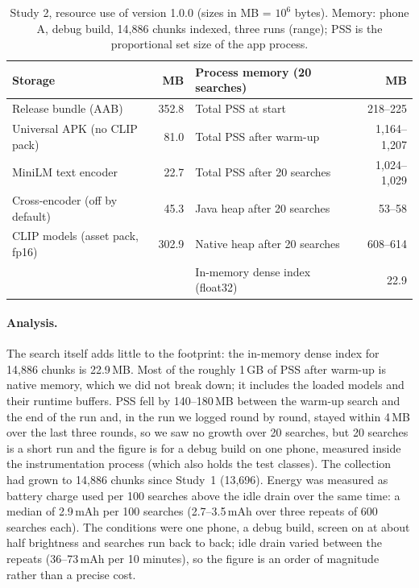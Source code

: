 \documentclass[pdflatex,sn-basic,Numbered]{sn-jnl}
\begin{document}
\begin{table}[tbp]
\centering\footnotesize\setlength{\tabcolsep}{3pt}
\caption{Study 2, resource use of version 1.0.0 (sizes in MB = $10^6$ bytes). Memory: phone A, debug build, 14,886 chunks indexed, three runs (range); PSS is the proportional set size of the app process.}
\label{tab:resources}
\begin{tabular}{lr@{\hspace{2.5em}}lr}
\toprule
Storage & MB & Process memory (20 searches) & MB \\
\midrule
Release bundle (AAB) & 352.8 & Total PSS at start & 218--225 \\
Universal APK (no CLIP pack) & 81.0 & Total PSS after warm-up & 1,164--1,207 \\
MiniLM text encoder & 22.7 & Total PSS after 20 searches & 1,024--1,029 \\
Cross-encoder (off by default) & 45.3 & Java heap after 20 searches & 53--58 \\
CLIP models (asset pack, fp16) & 302.9 & Native heap after 20 searches & 608--614 \\
 & & In-memory dense index (float32) & 22.9 \\
\bottomrule
\end{tabular}
\end{table}

\paragraph{Analysis.} The search itself adds little to the footprint: the in-memory dense index for 14,886 chunks is 22.9\,MB. Most of the roughly 1\,GB of PSS after warm-up is native memory, which we did not break down; it includes the loaded models and their runtime buffers. PSS fell by 140--180\,MB between the warm-up search and the end of the run and, in the run we logged round by round, stayed within 4\,MB over the last three rounds, so we saw no growth over 20 searches, but 20 searches is a short run and the figure is for a debug build on one phone, measured inside the instrumentation process (which also holds the test classes). The collection had grown to 14,886 chunks since Study~1 (13,696). Energy was measured as battery charge used per 100 searches above the idle drain over the same time: a median of 2.9\,mAh per 100 searches (2.7--3.5\,mAh over three repeats of 600 searches each). The conditions were one phone, a debug build, screen on at about half brightness and searches run back to back; idle drain varied between the repeats (36--73\,mAh per 10 minutes), so the figure is an order of magnitude rather than a precise cost.
\end{document}
